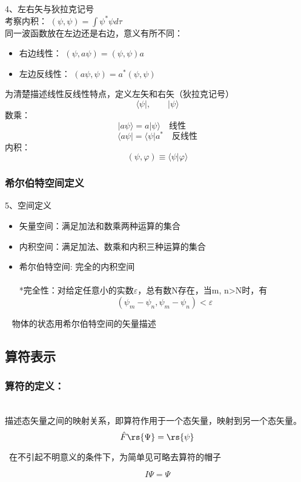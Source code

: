 \begin{frame}{}
    4、左右矢与狄拉克记号\\
    考察内积： $(\psi,\psi)=\int\psi^*\psi d\tau$ \\
    同一波函数放在左边还是右边，意义有所不同： 
    \begin{itemize}
        \item 右边线性：  $(\psi,a\psi)=(\psi,\psi)a $ 
        \item 左边反线性：   $(a\psi,\psi)=a^* (\psi,\psi)$ 
    \end{itemize}
    为清楚描述线性反线性特点，定义左矢和右矢（狄拉克记号）
    $$\langle \psi |, \qquad |\psi \rangle $$ 
    数乘： $$ |a\psi \rangle = a|\psi \rangle \quad \text{线性~~~~}$$ 
    $$\langle a\psi | = \langle \psi |a^* \quad \text{反线性}$$
    内积：\[(\psi,\varphi)\equiv \langle \psi | \varphi \rangle\]
\end{frame}

\begin{frame}
    \frametitle{希尔伯特空间定义}
    5、空间定义\\
   \begin{itemize}
       \item 矢量空间：满足加法和数乘两种运算的集合
       \item 内积空间：满足加法、数乘和内积三种运算的集合
       \item 希尔伯特空间:  完全的内积空间\\
       ~~ \\
       *完全性：对给定任意小的实数$\varepsilon$，总有数N存在，当m, n>N时，有\\
       $$ (\psi_m -\psi_n, \psi_m -\psi_n )< \varepsilon $$
   \end{itemize} 
   \Tips ~ 物体的状态用希尔伯特空间的矢量描述
\end{frame} 

\subsection{算符表示}

\begin{frame}
    \frametitle{算符的定义：}
    \emf[算符] \\
    描述态矢量之间的映射关系，即算符作用于一个态矢量，映射到另一个态矢量。
        \[\hat{F} \rs{\Psi}=\rs{\psi}\]
  
    \Tips~在不引起不明意义的条件下，为简单见可略去算符的帽子

    \emf[单位算符]
    \[I\Psi=\Psi \]  
\end{frame} 


